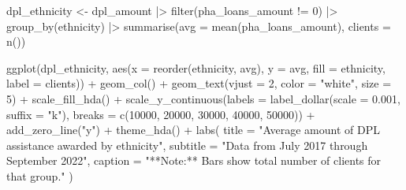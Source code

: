 \documentclass[
  letterpaper,
  DIV=11,
  numbers=noendperiod]{scrartcl}
\newenvironment{Shaded}{\begin{snugshade}}{\end{snugshade}}
\newcommand{\AttributeTok}[1]{\textcolor[rgb]{0.40,0.45,0.13}{#1}}
\newcommand{\DecValTok}[1]{\textcolor[rgb]{0.68,0.00,0.00}{#1}}
\newcommand{\FloatTok}[1]{\textcolor[rgb]{0.68,0.00,0.00}{#1}}
\newcommand{\FunctionTok}[1]{\textcolor[rgb]{0.28,0.35,0.67}{#1}}
\newcommand{\NormalTok}[1]{\textcolor[rgb]{0.00,0.23,0.31}{#1}}
\newcommand{\OtherTok}[1]{\textcolor[rgb]{0.00,0.23,0.31}{#1}}
\newcommand{\SpecialCharTok}[1]{\textcolor[rgb]{0.37,0.37,0.37}{#1}}
\newcommand{\StringTok}[1]{\textcolor[rgb]{0.13,0.47,0.30}{#1}}
\begin{document}
\begin{Shaded}
\begin{Highlighting}[]
\NormalTok{dpl\_ethnicity }\OtherTok{\textless{}{-}}\NormalTok{ dpl\_amount }\SpecialCharTok{|\textgreater{}} 
  \FunctionTok{filter}\NormalTok{(pha\_loans\_amount }\SpecialCharTok{!=} \DecValTok{0}\NormalTok{) }\SpecialCharTok{|\textgreater{}} 
  \FunctionTok{group\_by}\NormalTok{(ethnicity) }\SpecialCharTok{|\textgreater{}} 
  \FunctionTok{summarise}\NormalTok{(}\AttributeTok{avg =} \FunctionTok{mean}\NormalTok{(pha\_loans\_amount),}
            \AttributeTok{clients =} \FunctionTok{n}\NormalTok{())}

\FunctionTok{ggplot}\NormalTok{(dpl\_ethnicity, }\FunctionTok{aes}\NormalTok{(}\AttributeTok{x =} \FunctionTok{reorder}\NormalTok{(ethnicity, avg), }\AttributeTok{y =}\NormalTok{ avg, }\AttributeTok{fill =}\NormalTok{ ethnicity, }\AttributeTok{label =}\NormalTok{ clients)) }\SpecialCharTok{+}
  \FunctionTok{geom\_col}\NormalTok{() }\SpecialCharTok{+}
  \FunctionTok{geom\_text}\NormalTok{(}\AttributeTok{vjust =} \DecValTok{2}\NormalTok{,}
            \AttributeTok{color =} \StringTok{"white"}\NormalTok{,}
            \AttributeTok{size =} \DecValTok{5}\NormalTok{) }\SpecialCharTok{+}
  \FunctionTok{scale\_fill\_hda}\NormalTok{() }\SpecialCharTok{+}
  \FunctionTok{scale\_y\_continuous}\NormalTok{(}\AttributeTok{labels =} \FunctionTok{label\_dollar}\NormalTok{(}\AttributeTok{scale =} \FloatTok{0.001}\NormalTok{, }\AttributeTok{suffix =} \StringTok{"k"}\NormalTok{),}
                     \AttributeTok{breaks =} \FunctionTok{c}\NormalTok{(}\DecValTok{10000}\NormalTok{, }\DecValTok{20000}\NormalTok{, }\DecValTok{30000}\NormalTok{, }\DecValTok{40000}\NormalTok{, }\DecValTok{50000}\NormalTok{)) }\SpecialCharTok{+}
  \FunctionTok{add\_zero\_line}\NormalTok{(}\StringTok{"y"}\NormalTok{) }\SpecialCharTok{+}
  \FunctionTok{theme\_hda}\NormalTok{() }\SpecialCharTok{+}
  \FunctionTok{labs}\NormalTok{(}
    \AttributeTok{title =} \StringTok{"Average amount of DPL assistance awarded by ethnicity"}\NormalTok{,}
    \AttributeTok{subtitle =} \StringTok{"Data from July 2017 through September 2022"}\NormalTok{,}
    \AttributeTok{caption =} \StringTok{"**Note:** Bars show total number of clients for that group."}
\NormalTok{  )}
\end{Highlighting}
\end{Shaded}
\end{document}
